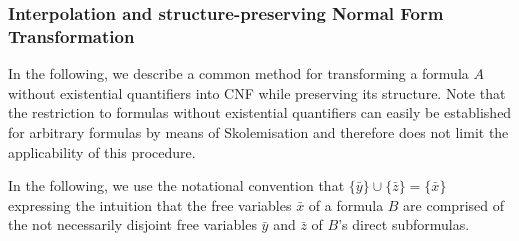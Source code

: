 \subsubsection{Interpolation and structure-preserving Normal Form Transformation}

In the following, we describe a common method for transforming a formula $A$ without existential quantifiers into CNF while preserving its structure.
Note that the restriction to formulas without existential quantifiers can easily be established for arbitrary formulas by means of Skolemisation and therefore does not limit the applicability of this procedure.

In the following, we use the notational convention that $\{\bar y\} \cup \{\bar z\} = \{\bar x\}$ expressing the intuition that the free variables $\bar x$ of a formula $B$ are comprised of the not necessarily disjoint free variables  $\bar y$ and $\bar z$ of $B$'s direct subformulas.

